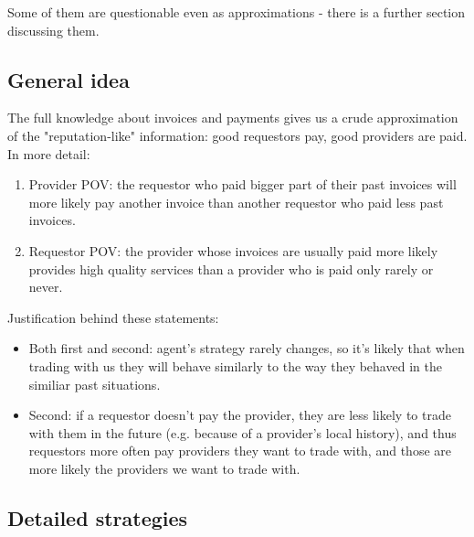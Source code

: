 \documentclass{article}
\begin{document}
Some of them are questionable even as approximations - there is a further section discussing them.

\subsection{General idea}

The full knowledge about invoices and payments gives us a crude approximation of the "reputation-like" information: 
good requestors pay, good providers are paid. In more detail:
\begin{enumerate}
    \item Provider POV: the requestor who paid bigger part of their past invoices will more likely pay another invoice than another requestor
        who paid less past invoices.
    \item Requestor POV: the provider whose invoices are usually paid more likely provides high quality services than a provider who is paid
        only rarely or never.
\end{enumerate}

Justification behind these statements:
\begin{itemize}
    \item Both first and second: agent's strategy rarely changes, so it's likely that when trading with us
        they will behave similarly to the way they behaved in the similiar past situations.
    \item Second: if a requestor doesn't pay the provider, they are less likely to trade with them in the future (e.g. because of a provider's local history), 
        and thus requestors more often pay providers they want to trade with, and those are more likely the providers we want to trade with.
\end{itemize}

\subsection{Detailed strategies}
\end{document}
